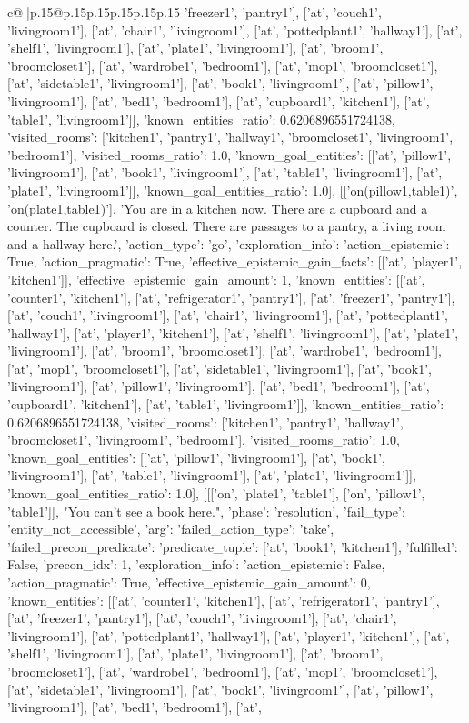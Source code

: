 \documentclass{article}
\begin{document}
{\begin{supertabular}{c@{$\;$}|p{.15\linewidth}@{}p{.15\linewidth}p{.15\linewidth}p{.15\linewidth}p{.15\linewidth}p{.15\linewidth}}
{{{'freezer1', 'pantry1'], ['at', 'couch1', 'livingroom1'], ['at', 'chair1', 'livingroom1'], ['at', 'pottedplant1', 'hallway1'], ['at', 'shelf1', 'livingroom1'], ['at', 'plate1', 'livingroom1'], ['at', 'broom1', 'broomcloset1'], ['at', 'wardrobe1', 'bedroom1'], ['at', 'mop1', 'broomcloset1'], ['at', 'sidetable1', 'livingroom1'], ['at', 'book1', 'livingroom1'], ['at', 'pillow1', 'livingroom1'], ['at', 'bed1', 'bedroom1'], ['at', 'cupboard1', 'kitchen1'], ['at', 'table1', 'livingroom1']], 'known_entities_ratio': 0.6206896551724138, 'visited_rooms': ['kitchen1', 'pantry1', 'hallway1', 'broomcloset1', 'livingroom1', 'bedroom1'], 'visited_rooms_ratio': 1.0, 'known_goal_entities': [['at', 'pillow1', 'livingroom1'], ['at', 'book1', 'livingroom1'], ['at', 'table1', 'livingroom1'], ['at', 'plate1', 'livingroom1']], 'known_goal_entities_ratio': 1.0}}], [['on(pillow1,table1)', 'on(plate1,table1)'], 'You are in a kitchen now. There are a cupboard and a counter. The cupboard is closed. There are passages to a pantry, a living room and a hallway here.', {'action_type': 'go', 'exploration_info': {'action_epistemic': True, 'action_pragmatic': True, 'effective_epistemic_gain_facts': [['at', 'player1', 'kitchen1']], 'effective_epistemic_gain_amount': 1, 'known_entities': [['at', 'counter1', 'kitchen1'], ['at', 'refrigerator1', 'pantry1'], ['at', 'freezer1', 'pantry1'], ['at', 'couch1', 'livingroom1'], ['at', 'chair1', 'livingroom1'], ['at', 'pottedplant1', 'hallway1'], ['at', 'player1', 'kitchen1'], ['at', 'shelf1', 'livingroom1'], ['at', 'plate1', 'livingroom1'], ['at', 'broom1', 'broomcloset1'], ['at', 'wardrobe1', 'bedroom1'], ['at', 'mop1', 'broomcloset1'], ['at', 'sidetable1', 'livingroom1'], ['at', 'book1', 'livingroom1'], ['at', 'pillow1', 'livingroom1'], ['at', 'bed1', 'bedroom1'], ['at', 'cupboard1', 'kitchen1'], ['at', 'table1', 'livingroom1']], 'known_entities_ratio': 0.6206896551724138, 'visited_rooms': ['kitchen1', 'pantry1', 'hallway1', 'broomcloset1', 'livingroom1', 'bedroom1'], 'visited_rooms_ratio': 1.0, 'known_goal_entities': [['at', 'pillow1', 'livingroom1'], ['at', 'book1', 'livingroom1'], ['at', 'table1', 'livingroom1'], ['at', 'plate1', 'livingroom1']], 'known_goal_entities_ratio': 1.0}}], [[['on', 'plate1', 'table1'], ['on', 'pillow1', 'table1']], "You can't see a book here.", {'phase': 'resolution', 'fail_type': 'entity_not_accessible', 'arg': {'failed_action_type': 'take', 'failed_precon_predicate': {'predicate_tuple': ['at', 'book1', 'kitchen1'], 'fulfilled': False, 'precon_idx': 1}}, 'exploration_info': {'action_epistemic': False, 'action_pragmatic': True, 'effective_epistemic_gain_amount': 0, 'known_entities': [['at', 'counter1', 'kitchen1'], ['at', 'refrigerator1', 'pantry1'], ['at', 'freezer1', 'pantry1'], ['at', 'couch1', 'livingroom1'], ['at', 'chair1', 'livingroom1'], ['at', 'pottedplant1', 'hallway1'], ['at', 'player1', 'kitchen1'], ['at', 'shelf1', 'livingroom1'], ['at', 'plate1', 'livingroom1'], ['at', 'broom1', 'broomcloset1'], ['at', 'wardrobe1', 'bedroom1'], ['at', 'mop1', 'broomcloset1'], ['at', 'sidetable1', 'livingroom1'], ['at', 'book1', 'livingroom1'], ['at', 'pillow1', 'livingroom1'], ['at', 'bed1', 'bedroom1'], ['at', }}}
\end{supertabular}}
\end{document}
